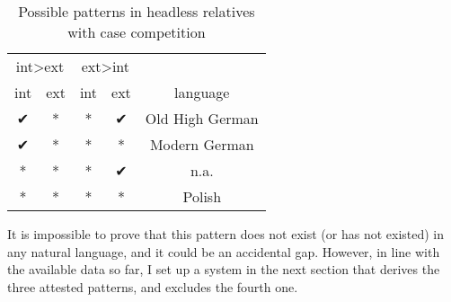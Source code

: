\begin{table}[H]
  \center
  \caption{Possible patterns in headless relatives with case competition}
    \begin{tabular}{cc|ccc}
    \toprule
    \multicolumn{2}{c}{\ac{int}>\ac{ext}}   & \multicolumn{2}{|c}{\ac{ext}>\ac{int}} &                                           \\
    \cmidrule(lr){1-2}                      \cmidrule(lr){3-4}
    \ac{int}            & \ac{ext}          & \ac{int}          & \ac{ext}            & language                                  \\
    \cmidrule(lr){1-1}  \cmidrule(lr){2-2}  \cmidrule(lr){3-3}  \cmidrule(lr){4-4}    \cmidrule(lr){5-5}
    ✔                   & *                 & *                 & ✔                   & Old High German                           \\
    ✔                   & *                 & *                 & *                   & Modern German                             \\
    {*}                 & *                 & *                 & ✔                   & n.a.                                      \\
    {*}                 & *                 & *                 & *                   & Polish                                    \\
    \bottomrule
  \end{tabular}
    \label{tbl:possible-headless-relatives-case-competition}
\end{table}

It is impossible to prove that this pattern does not exist (or has not existed) in any natural language, and it could be an accidental gap. However, in line with the available data so far, I set up a system in the next section that derives the three attested patterns, and excludes the fourth one.

